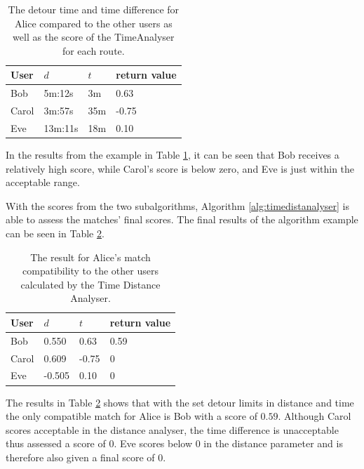 \begin{table}[!ht]
\centering
\begin{tabular}{@{}llll@{}}
\toprule
\textbf{User} 	& \textbf{$d$} & \textbf{$t$} 	& \textbf{return value} \\ \midrule
Bob         	& 5m:12s       & 3m			    & 0.63				\\
Carol         	& 3m:57s       & 35m	      	& -0.75       		\\
Eve           	& 13m:11s      & 18m			& 0.10        		\\ \bottomrule
\end{tabular}
\caption{The detour time and time difference for Alice compared to the other users as well as the score of the TimeAnalyser for each route.}
\label{tbl:time}
\end{table}

In the results from the example in Table \ref{tbl:time}, it can be seen that Bob receives a relatively high score, while Carol's score is below zero, and Eve is just within the acceptable range. 

With the scores from the two subalgorithms, Algorithm \ref{alg:timedistanalyser} is able to assess the matches' final scores.
The final results of the algorithm example can be seen in Table \ref{tbl:timedist}.

\begin{table}[!ht]
\centering
\begin{tabular}{@{}llll@{}}
\toprule
\textbf{User} 	& \textbf{$d$} & \textbf{$t$} 	& \textbf{return value} \\ \midrule
Bob         	& 0.550 	   & 0.63		    & 0.59					\\
Carol         	& 0.609        & -0.75	      	& 0       				\\
Eve           	& -0.505       & 0.10			& 0        				\\ \bottomrule
\end{tabular}
\caption{The result for Alice's match compatibility to the other users calculated by the Time Distance Analyser.}
\label{tbl:timedist}
\end{table}

The results in Table \ref{tbl:timedist} shows that with the set detour limits in distance and time the only compatible match for Alice is Bob with a score of $0.59$. 
Although Carol scores acceptable in the distance analyser, the time difference is unacceptable thus assessed a score of $0$.
Eve scores below 0 in the distance parameter and is therefore also given a final score of $0$.

